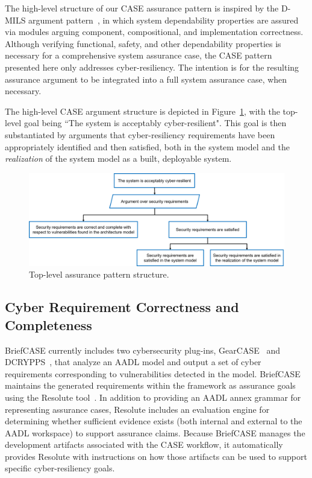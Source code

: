 The high-level structure of our CASE assurance pattern is inspired by the D-MILS argument pattern~\cite{dmils}, in which system dependability properties are assured via modules arguing component, compositional, and implementation correctness.  
Although verifying functional, safety, and other dependability properties is necessary for a comprehensive system assurance case, the CASE pattern presented here only addresses cyber-resiliency.  The intention is for the resulting assurance argument to be integrated into a full system assurance case, when necessary.

The high-level CASE argument structure is depicted in Figure~\ref{fig:top-level}, with the top-level goal being ``The system is acceptably cyber-resilient".  
This goal is then substantiated by arguments that cyber-resiliency requirements have been appropriately identified and then satisfied, both in the system model and the \textit{realization} of the system model as a built, deployable system.

\begin{figure}[h] 
	\centering 
	\includegraphics[width=\textwidth]{figs/top-level.png}
	\caption{Top-level assurance pattern structure.}
	\label{fig:top-level} 
\end{figure}



\subsection{Cyber Requirement Correctness and Completeness}
BriefCASE currently includes two cybersecurity plug-ins, GearCASE~\cite{gearcase2020} and DCRYPPS~\cite{dcrypps2019}, that analyze an AADL model and output a set of cyber requirements corresponding to vulnerabilities detected in the model.  
BriefCASE maintains the generated requirements within the framework as assurance goals using the Resolute tool~\cite{resolute2014}.  
In addition to providing an AADL annex grammar for representing assurance cases, Resolute includes an evaluation engine for determining whether sufficient evidence exists (both internal and external to the AADL workspace) to support assurance claims.  
Because BriefCASE manages the development artifacts associated with the CASE workflow, it automatically provides Resolute with instructions on how those artifacts can be used to support specific cyber-resiliency goals.


